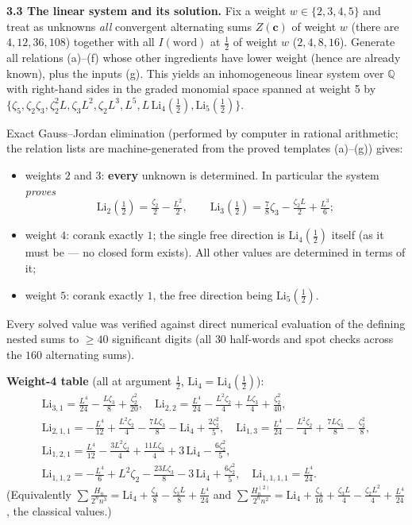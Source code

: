 \documentclass[11pt]{article}
\theoremstyle{remark}
\begin{document}
\textbf{3.3 The linear system and its solution.} Fix a weight $w\in\{2,3,4,5\}$ and treat as unknowns \textit{all} convergent alternating sums $Z(\mathbf c)$ of weight $w$ (there are $4,12,36,108$) together with all $I(\text{word})$ at $\tfrac12$ of weight $w$ ($2,4,8,16$). Generate all relations (a)--(f) whose other ingredients have lower weight (hence are already known), plus the inputs (g). This yields an inhomogeneous linear system over $\mathbb Q$ with right-hand sides in the graded monomial space spanned at weight 5 by $\{\zeta_5,\zeta_2\zeta_3,\zeta_2^2L,\zeta_3L^2,\zeta_2L^3,L^5,L\,\mathrm{Li}_4(\tfrac12),\mathrm{Li}_5(\tfrac12)\}$.

Exact Gauss--Jordan elimination (performed by computer in rational arithmetic; the relation lists are machine-generated from the proved templates (a)--(g)) gives:

\begin{itemize}
\item weights $2$ and $3$: \textbf{every} unknown is determined. In particular the system \textit{proves}
\begin{equation*}
\mathrm{Li}_2(\tfrac12)=\tfrac{\zeta_2}2-\tfrac{L^2}2,\qquad \mathrm{Li}_3(\tfrac12)=\tfrac78\zeta_3-\tfrac{\zeta_2L}2+\tfrac{L^3}6; \tag{3.9}
\end{equation*}
\item weight $4$: corank exactly $1$; the single free direction is $\mathrm{Li}_4(\tfrac12)$ itself (as it must be --- no closed form exists). All other values are determined in terms of it;
\item weight $5$: corank exactly $1$, the free direction being $\mathrm{Li}_5(\tfrac12)$.
\end{itemize}

Every solved value was verified against direct numerical evaluation of the defining nested sums to $\ge40$ significant digits (all $30$ half-words and spot checks across the $160$ alternating sums).

\textbf{Weight-4 table} (all at argument $\tfrac12$, $\mathrm{Li}_4=\mathrm{Li}_4(\tfrac12)$):
\begin{gather*}
\mathrm{Li}_{3,1}=\tfrac{L^4}{24}-\tfrac{L\zeta_3}8+\tfrac{\zeta_2^2}{20},\quad
\mathrm{Li}_{2,2}=\tfrac{L^4}{24}-\tfrac{L^2\zeta_2}4+\tfrac{L\zeta_3}4+\tfrac{\zeta_2^2}{40},\\
\mathrm{Li}_{2,1,1}=-\tfrac{L^4}{12}+\tfrac{L^2\zeta_2}4-\tfrac{7L\zeta_3}8-\mathrm{Li}_4+\tfrac{2\zeta_2^2}5,\quad
\mathrm{Li}_{1,3}=\tfrac{L^4}{24}-\tfrac{L^2\zeta_2}4+\tfrac{7L\zeta_3}8-\tfrac{\zeta_2^2}8,\\
\mathrm{Li}_{1,2,1}=\tfrac{L^4}{12}-\tfrac{3L^2\zeta_2}4+\tfrac{11L\zeta_3}4+3\,\mathrm{Li}_4-\tfrac{6\zeta_2^2}5,\\
\mathrm{Li}_{1,1,2}=-\tfrac{L^4}6+L^2\zeta_2-\tfrac{23L\zeta_3}8-3\,\mathrm{Li}_4+\tfrac{6\zeta_2^2}5,\quad
\mathrm{Li}_{1,1,1,1}=\tfrac{L^4}{24}.
\end{gather*}
(Equivalently $\sum\frac{H_n}{2^nn^3}=\mathrm{Li}_4+\tfrac{\zeta_4}8-\tfrac{\zeta_3L}8+\tfrac{L^4}{24}$ and
$\sum\frac{H_n^{(2)}}{2^nn^2}=\mathrm{Li}_4+\tfrac{\zeta_4}{16}+\tfrac{\zeta_3L}4-\tfrac{\zeta_2L^2}4+\tfrac{L^4}{24}$, the classical values.)
\end{document}
